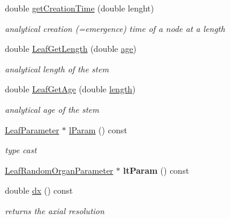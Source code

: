 \begin{DoxyCompactItemize}
double \hyperlink{classCPlantBox_1_1Leaf_afe95477ee2292326a11b2844ca336229}{get\+Creation\+Time} (double lenght)
\begin{DoxyCompactList}\small\item\em analytical creation (=emergence) time of a node at a length \end{DoxyCompactList}\item 
double \hyperlink{classCPlantBox_1_1Leaf_a7056b1a0b28172daa7ce5e69b2f6c435}{Leaf\+Get\+Length} (double \hyperlink{classCPlantBox_1_1Organ_a4f17f0bfe7f03eedf4138fd8fe51376d}{age})
\begin{DoxyCompactList}\small\item\em analytical length of the stem \end{DoxyCompactList}\item 
double \hyperlink{classCPlantBox_1_1Leaf_a9939b2ee6247b9354dbe6d6c16d3442e}{Leaf\+Get\+Age} (double \hyperlink{classCPlantBox_1_1Organ_a94f5b16aa7ebc3912501051281fe88dc}{length})
\begin{DoxyCompactList}\small\item\em analytical age of the stem \end{DoxyCompactList}\item 
\mbox{\label{classCPlantBox_1_1Leaf_aa9161845b757757d56aebad1abe293fd}} 
\hyperlink{classCPlantBox_1_1LeafParameter}{Leaf\+Parameter} $\ast$ \hyperlink{classCPlantBox_1_1Leaf_aa9161845b757757d56aebad1abe293fd}{l\+Param} () const
\begin{DoxyCompactList}\small\item\em type cast \end{DoxyCompactList}\item 
\mbox{\label{classCPlantBox_1_1Leaf_a91f9c3be23a6fd3d2c9b5438fc74e0fa}} 
\hyperlink{classCPlantBox_1_1LeafRandomOrganParameter}{Leaf\+Random\+Organ\+Parameter} $\ast$ {\bfseries lt\+Param} () const
\item 
\mbox{\label{classCPlantBox_1_1Leaf_a9999dbde2459edd66dc2a9c2d262c11e}} 
double \hyperlink{classCPlantBox_1_1Leaf_a9999dbde2459edd66dc2a9c2d262c11e}{dx} () const
\begin{DoxyCompactList}\small\item\em returns the axial resolution \end{DoxyCompactList}\item 

\end{DoxyCompactItemize}
